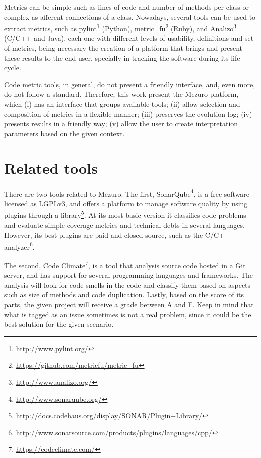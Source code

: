 \documentclass{llncs}
\begin{document}
Metrics can be simple such as lines of code and number of methods per class or
complex as afferent connections of a class. Nowadays, several tools can be
used to extract metrics, such as
pylint\footnote{\url{http://www.pylint.org/}} (Python),
metric\_fu\footnote{\url{https://github.com/metricfu/metric_fu}} (Ruby), and
Analizo\footnote{\url{http://www.analizo.org/}} (C/C++ and Java), each one with
different levels of usability, definitions and set of metrics, being necessary
the creation of a platform that brings and present these results to the end
user, specially in tracking the software during its life cycle.

Code metric tools, in general, do not present a friendly interface, and,
even more, do not follow a standard. Therefore, this work present the
Mezuro platform, which (i) has an interface that groups available tools;
(ii) allow selection and composition of metrics in a flexible manner;
(iii) preserves the evolution log;
(iv) presents results in a friendly way;
(v) allow the user to create interpretation parameters based on the given
context.

\section{Related tools}

There are two tools related to Mezuro. The first, SonarQube\footnote{\url{http://www.sonarqube.org/}}, is a free software licensed as LGPLv3, and offers a platform to manage software quality by using plugins through a 
library\footnote{\url{http://docs.codehaus.org/display/SONAR/Plugin+Library/}}.
At its most basic version it classifies code problems and evaluate simple
coverage metrics and technical debts in several languages. However, its best
plugins are paid and closed source, such as the
C/C++ analyzer\footnote{\url{http://www.sonarsource.com/products/plugins/languages/cpp/}}.

The second, Code Climate\footnote{\url{https://codeclimate.com/}}, is a tool
that analysis source code hosted in a Git server, and has support for several
programming languages and frameworks. The analysis will look for code smells
in the code and classify them based on aspects such as size of methods and
code duplication. Lastly, based on the score of its parts, the given project
will receive a grade between A and F. Keep in mind that what is tagged as an
issue sometimes is not a real problem, since it could be the best solution for
the given scenario.
\end{document}
